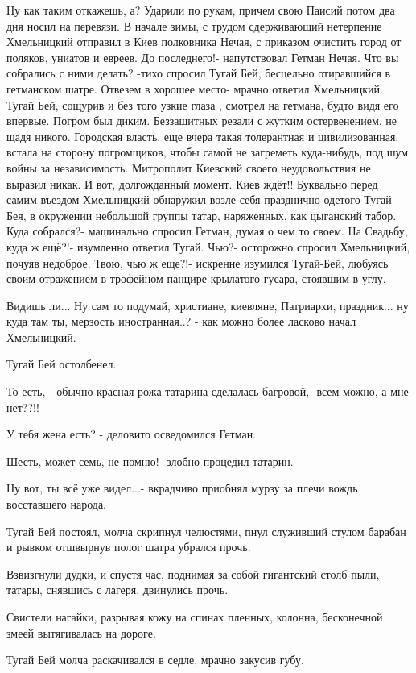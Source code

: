 Ну как таким откажешь, а?
Ударили по рукам, причем свою Паисий потом два дня носил на перевязи.
В начале зимы, с трудом сдерживающий нетерпение Хмельницкий отправил в Киев полковника Нечая, с приказом очистить город от поляков, униатов и евреев.
До последнего!- напутствовал Гетман Нечая.
Что вы собрались с ними делать? -тихо спросил Тугай Бей, бесцельно отиравшийся в гетманском шатре.
Отвезем в хорошее место- мрачно ответил Хмельницкий. 
Тугай Бей, сощурив и без того узкие глаза , смотрел на гетмана, будто видя его впервые.
Погром был диким.
Беззащитных резали с жутким остервенением, не щадя никого.
Городская власть, еще вчера такая толерантная и цивилизованная, встала на сторону погромщиков, чтобы самой не загреметь куда-нибудь, под шум войны за независимость.
Митрополит Киевский своего неудовольствия не выразил никак.
И вот, долгожданный момент.
Киев ждёт!!
Буквально перед самим въездом Хмельницкий обнаружил возле себя празднично одетого Тугай Бея, в окружении небольшой группы татар, наряженных, как цыганский табор.
Куда собрался?- машинально спросил Гетман, думая о чем то своем.
На Свадьбу, куда ж ещё?!- изумленно ответил Тугай.
Чью?- осторожно спросил Хмельницкий, почуяв недоброе.
Твою, чью ж еще?!- искренне изумился Тугай-Бей, любуясь своим отражением в трофейном панцире крылатого гусара, стоявшим в углу.

Видишь ли... Ну сам то подумай, христиане, киевляне, Патриархи, праздник... ну
куда там ты, мерзость иностранная..? - как можно более ласково  начал
Хмельницкий.

Тугай Бей остолбенел.

То есть, - обычно красная рожа татарина сделалась багровой,- всем можно, а мне нет??!! 

У тебя жена есть? - деловито осведомился Гетман.

Шесть, может семь, не помню!- злобно процедил татарин.

Ну вот, ты всё уже видел...- вкрадчиво приобнял мурзу за плечи вождь восставшего народа.

Тугай Бей постоял, молча скрипнул челюстями, пнул служивший стулом барабан и
рывком отшвырнув полог шатра убрался прочь.

Взвизгнули дудки, и спустя час, поднимая за собой гигантский столб пыли,
татары, снявшись с лагеря, двинулись прочь.

Свистели нагайки, разрывая кожу на спинах пленных, колонна, бесконечной змеей вытягивалась на дороге.

Тугай Бей молча раскачивался в седле, мрачно закусив губу.

